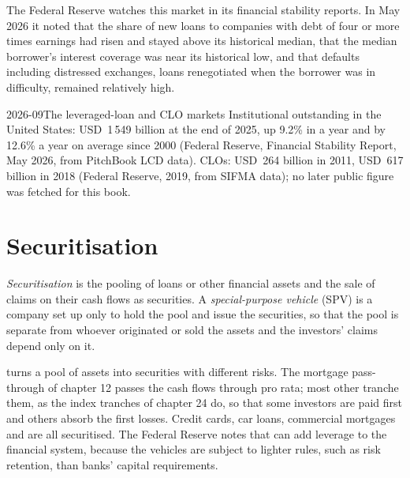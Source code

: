 The Federal Reserve watches this market in its financial stability reports. In May
2026 it noted that the share of new loans to companies with debt of four or more times
earnings had risen and stayed above its historical median, that the median borrower's
interest coverage was near its historical low, and that defaults including distressed
exchanges, loans renegotiated when the borrower was in difficulty, remained relatively
high.

\begin{dated}{2026-09}{The leveraged-loan and CLO markets}\label{dat:m2:loans-clos-and-securitisation:size}
Institutional  outstanding in the United States: USD~1\,549 billion at
the end of 2025, up 9.2\% in a year and by 12.6\% a year on average since 2000
(Federal Reserve, Financial Stability Report, May 2026, from PitchBook LCD data).
CLOs: USD~264 billion in 2011, USD~617 billion in 2018 (Federal Reserve, 2019, from
SIFMA data); no later public figure was fetched for this book.
\end{dated}

\section{Securitisation}

\begin{definition}\label{def:m2:loans-clos-and-securitisation:sec}
\emph{Securitisation} is the pooling of loans or other
financial assets and the sale of claims on their cash flows as securities. A
\emph{special-purpose vehicle} (SPV) is a company set up
only to hold the pool and issue the securities, so that the pool is separate from
whoever originated or sold the assets and the investors' claims depend only on it.
\end{definition}

 turns a pool of assets into securities with different risks. The
mortgage pass-through of chapter 12 passes the cash flows through pro rata; most other
 tranche them, as the index tranches of chapter 24 do, so that some
investors are paid first and others absorb the first losses. Credit cards, car loans,
commercial mortgages and  are all securitised. The Federal Reserve
notes that  can add leverage to the financial system, because the
vehicles are subject to lighter rules, such as risk retention, than banks' capital
requirements.

